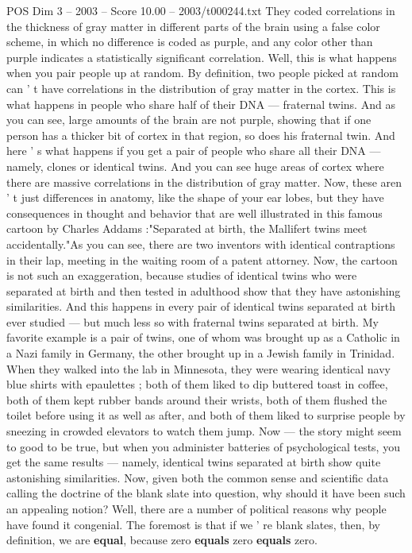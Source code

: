 \begin{textsample}{POS Dim 3 – 2003 – Score 10.00 – 2003/t000244.txt}
They coded correlations in the thickness of gray matter in different parts of the brain using a false color scheme, in which no difference is coded as purple, and any color other than purple indicates a statistically significant correlation.
Well, this is what happens when you pair people up at random.
By definition, two people picked at random can ' t have correlations in the distribution of gray matter in the cortex.
This is what happens in people who share half of their DNA — fraternal twins.
And as you can see, large amounts of the brain are not purple, showing that if one person has a thicker bit of cortex in that region, so does his fraternal twin.
And here ' s what happens if you get a pair of people who share all their DNA — namely, clones or identical twins.
And you can see huge areas of cortex where there are massive correlations in the distribution of gray matter.
Now, these aren ' t just differences in anatomy, like the shape of your ear lobes, but they have consequences in thought and behavior that are well illustrated in this famous cartoon by Charles Addams :"Separated at birth, the Mallifert twins meet accidentally."As you can see, there are two inventors with identical contraptions in their lap, meeting in the waiting room of a patent attorney.
Now, the cartoon is not such an exaggeration, because studies of identical twins who were separated at birth and then tested in adulthood show that they have astonishing similarities.
And this happens in every pair of identical twins separated at birth ever studied — but much less so with fraternal twins separated at birth.
My favorite example is a pair of twins, one of whom was brought up as a Catholic in a Nazi family in Germany, the other brought up in a Jewish family in Trinidad.
When they walked into the lab in Minnesota, they were wearing identical navy blue shirts with epaulettes ; both of them liked to dip buttered toast in coffee, both of them kept rubber bands around their wrists, both of them flushed the toilet before using it as well as after, and both of them liked to surprise people by sneezing in crowded elevators to watch them jump.
Now — the story might seem to good to be true, but when you administer batteries of psychological tests, you get the same results — namely, identical twins separated at birth show quite astonishing similarities.
Now, given both the common sense and scientific data calling the doctrine of the blank slate into question, why should it have been such an appealing notion?
Well, there are a number of political reasons why people have found it congenial.
The foremost is that if we ' re blank slates, then, by definition, we are \textbf{equal}, because zero \textbf{equals} zero \textbf{equals} zero.

\end{textsample}
